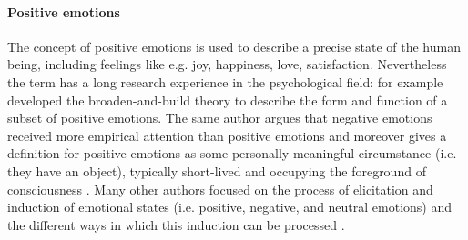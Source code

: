 \documentclass[	
	12pt, %
	a4paper, %
  abstracton
]{scrartcl}\usepackage[]{graphicx}\usepackage[]{color}
\begin{document}
\paragraph{Positive emotions}
The concept of positive emotions is used to describe a precise state of the human being, including feelings like e.g. joy, happiness, love, satisfaction. Nevertheless the term has a long research experience in the psychological field:  for example developed the broaden-and-build theory to describe the form and function of a subset of positive emotions. The same author argues that negative emotions received more empirical attention than positive emotions and moreover gives a definition for positive emotions as some personally meaningful circumstance (i.e. they have an object), typically short-lived and occupying the foreground of consciousness \cite{Fredrickson2004}. Many other authors focused on the process of elicitation and induction of emotional states (i.e. positive, negative, and neutral emotions) and the different ways in which this induction can be processed \cite{Hamm1993, Macht2002, Gross1995, Velten1968, Westermann1996}. %



\end{document}
